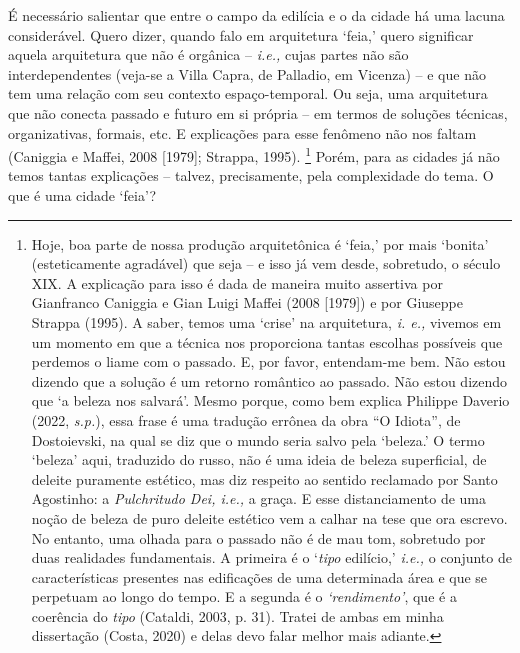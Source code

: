 \documentclass[]{report}
\begin{document}
	É necessário salientar que entre o campo da edilícia e o da cidade há uma lacuna considerável. Quero dizer, quando falo em arquitetura `feia,' quero significar aquela arquitetura que não é orgânica – \textit{i.e.,} cujas partes não são interdependentes (veja-se a Villa Capra, de Palladio, em Vicenza) – e que não tem uma relação com seu contexto espaço-temporal. Ou seja, uma arquitetura que não conecta passado e futuro em si própria – em termos de soluções técnicas, organizativas, formais, etc. E explicações para esse fenômeno não nos faltam (Caniggia e Maffei, 2008 [1979]; Strappa, 1995).
		\footnote[2]{Hoje, boa parte de nossa produção arquitetônica é `feia,' por mais `bonita' (esteticamente agradável) que seja – e isso já vem desde, sobretudo, o século XIX. A explicação para isso é dada de maneira muito assertiva por Gianfranco Caniggia e Gian Luigi Maffei (2008 [1979]) e por Giuseppe Strappa (1995). A saber, temos uma `crise' na arquitetura, \textit{i. e.,} vivemos em um momento em que a técnica nos proporciona tantas escolhas possíveis que perdemos o liame com o passado. E, por favor, entendam-me bem. Não estou dizendo que a solução é um retorno romântico ao passado. Não estou dizendo que `a beleza nos salvará'. Mesmo porque, como bem explica Philippe Daverio (2022, \textit{s.p.}), essa frase é uma tradução errônea da obra ``O Idiota'', de Dostoievski, na qual se diz que o mundo seria salvo pela `beleza.' O termo `beleza' aqui, traduzido do russo, não é uma ideia de beleza superficial, de deleite puramente estético, mas diz respeito ao sentido reclamado por Santo Agostinho: a \textit{Pulchritudo Dei, i.e.,} a graça. E esse distanciamento de uma noção de beleza de puro deleite estético vem a calhar na tese que ora escrevo. No entanto, uma olhada para o passado não é de mau tom, sobretudo por duas realidades fundamentais. A primeira é o `\textit{tipo} edilício,' \textit{i.e.,} o conjunto de características presentes nas edificações de uma determinada área e que se perpetuam ao longo do tempo. E a segunda é o \textit{`rendimento'}, que é a coerência do \textit{tipo} (Cataldi, 2003, p. 31). Tratei de ambas em minha dissertação (Costa, 2020) e delas devo falar melhor mais adiante.}
	Porém, para as cidades já não temos tantas explicações – talvez, precisamente, pela complexidade do tema. O que é uma cidade `feia'?
\end{document}
